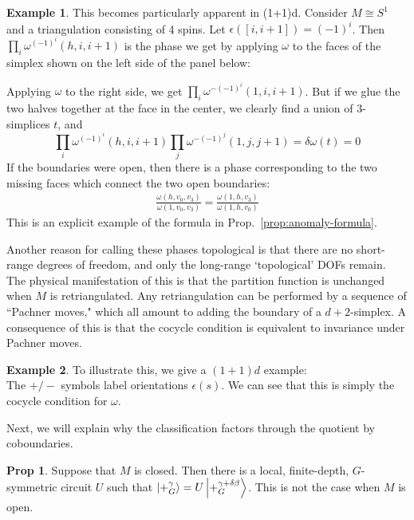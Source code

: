 \documentclass{article}
\theoremstyle{definition}
\theoremstyle{definition}
\newtheorem{prop}{Prop}
\newtheorem{ex}{Example}
\begin{document}
\begin{ex}\label{ex:edge-modes-1d-example}
This becomes particularly apparent in (1+1)d. Consider $M \cong S^1$ and a
triangulation consisting of 4 spins. Let $\epsilon([i, i+1]) = (-1)^i$. Then
$\prod_{i}\omega^{(-1)^i}(h, i, i+1)$ is the phase we get by applying $\omega$ to the faces of the simplex shown on the left side of the panel below:
\begin{center}

\end{center}
Applying $\omega$ to the right side, we get $\prod_{i}\omega^{-(-1)^i}(1, i, i+1)$. But if we glue the two halves together at the face in the center, we clearly find a union of 3-simplices $t$, and 
\begin{equation}
\prod_{i}\omega^{(-1)^i}(h, i, i+1) \prod_{j} \omega^{-(-1)^j}(1, j, j+1) = \delta \omega(t) = 0
\end{equation}
If the boundaries were open, then there is a phase corresponding to the two
missing faces which connect the two open boundaries:
\begin{align}
\frac{\omega(h, v_0, v_3)}{\omega(1, v_0, v_3)} = \frac{\omega(1,h, v_3)}{\omega(1,h, v_0)}
\end{align}
This is an explicit example of the formula in Prop.~\ref{prop:anomaly-formula}.
\end{ex}

Another reason for calling these phases topological is that there are no
short-range degrees of freedom, and only the long-range `topological' DOFs
remain. The physical manifestation of this is that the partition function is
unchanged when $M$ is retriangulated.
Any retriangulation can be performed by a
sequence of ``Pachner moves," \cite{twisted_qd} which all amount to adding the
boundary of a $d+2$-simplex. A consequence of this is that the cocycle
condition is equivalent to invariance under Pachner moves.

 \begin{ex}\label{ex:Pachner-move-1d-example}
 To illustrate this, we give a $(1+1)d$ example:
\begin{equation}

\end{equation}
The $+/-$ symbols label orientations $\epsilon(s)$. We can see that this is simply the cocycle condition for $\omega$.
\end{ex}

Next, we will explain why the classification factors through the quotient by
coboundaries.
\begin{prop}\label{prop:SPTs-are-classified-by-cohomology}
  Suppose that $M$ is closed.
  Then there is a local, finite-depth, $G$-symmetric circuit $U$ such that
  $\ket{+^\gamma_G} = U\ket{+^{\gamma + \delta \beta}_G}$. This is not the case when $M$ is open.
\end{prop}
\end{document}
